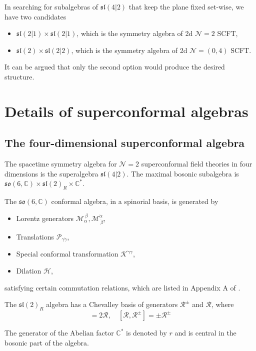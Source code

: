 \documentclass[a4paper,11pt]{article}
\begin{document}
In searching for subalgebras of $\mathfrak{sl}(4|2)$ that keep the plane fixed set-wise, we have two candidates
\begin{itemize}
    \item $\mathfrak{sl}(2|1) \times \mathfrak{sl}(2|1)$, which is the symmetry algebra of 2d $\mathcal{N}=2$ SCFT,
    \item $\mathfrak{sl}(2) \times \mathfrak{sl}(2|2)$, which is the symmetry algebra of 2d $\mathcal{N}= (0,4)$ SCFT.
\end{itemize}
It can be argued that only the second option would produce the desired structure.

\section{Details of superconformal algebras}
\subsection{The four-dimensional superconformal algebra}
The spacetime symmetry algebra for $\mathcal{N}=2$ superconformal field theories in four dimensions is the superalgebra $\mathfrak{sl}(4|2)$. The maximal bosonic subalgebra is $\mathfrak{so}(6, \mathbb{C}) \times \mathfrak{sl}(2)_R \times \mathbb{C}^*$.

The $\mathfrak{so}(6, \mathbb{C})$ conformal algebra, in a spinorial basis, is generated by
\begin{itemize}
    \item Lorentz generators $\mathcal{M}_\alpha^{~\beta}, \mathcal{M}^{\dot{\alpha}}_{~\dot{\beta}}$,
    \item Translations $\mathcal{P}_{\gamma \dot{\gamma}}$,
    \item Special conformal transformation $\mathcal{K}^{\dot{\gamma} \gamma}$,
    \item Dilation $\mathcal{H}$,
\end{itemize}
satisfying certain commutation relations, which are listed in Appendix A of \cite{Beem:2013sza}.

The $\mathfrak{sl}(2)_R$ algebra has a Chevalley basis of generators $\mathcal{R}^\pm$ and $\mathcal{R}$, where
\begin{equation}
    [\mathcal{R}^+, \mathcal{R}^-] = 2 \mathcal{R}, \quad [\mathcal{R}, \mathcal{R}^\pm] = \pm \mathcal{R}^\pm
\end{equation}

The generator of the Abelian factor $\mathbb{C}^*$ is denoted by $r$ and is central in the bosonic part of the algebra.
\end{document}
